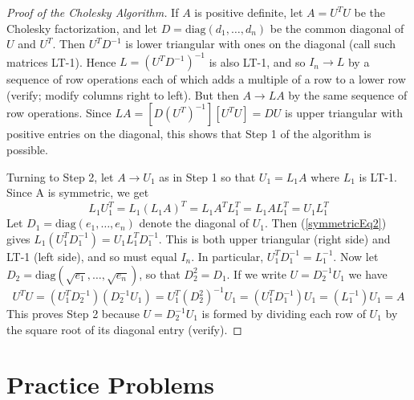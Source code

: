 \documentclass{ximera}
\begin{document}
\begin{proof}[Proof of the Cholesky Algorithm]
If $A$ is positive definite, let $A = U^{T}U$ be the Cholesky factorization, and let $D = \mbox{diag}(d_{1}, \dots, d_{n})$ be the common diagonal of $U$ and $U^{T}$. Then $U^{T}D^{-1}$ is lower triangular with ones on the diagonal (call such matrices LT-1). Hence $L = (U^{T}D^{-1})^{-1}$ is also LT-1, and so $I_{n} \to L$ by a sequence of row operations each of which adds a multiple of a row
to a lower row (verify; modify columns right to left). But then $A \to LA$ by the same sequence of row operations. Since $LA = [D(U^{T})^{-1}][U^{T}U] = DU$ is upper triangular with positive entries on the diagonal, this shows that Step 1 of the algorithm is possible.

Turning to Step 2, let $A \to U_{1}$ as in Step 1 so that $U_{1} = L_{1}A$ where $L_{1}$ is
LT-1. Since A is symmetric, we get
\begin{equation} \label{symmetricEq2}
L_{1}U_{1}^T = L_{1}(L_{1}A)^T = L_{1}A^TL_{1}^T = L_{1}AL_{1}^T = U_{1}L_{1}^T
\end{equation}
Let $D_{1} = \mbox{diag}(e_{1}, \dots, e_{n})$ denote the diagonal of $U_{1}$. Then (\ref{symmetricEq2}) gives $L_{1}(U_{1}^TD_{1}^{-1}) = U_{1}L_{1}^TD_{1}^{-1}$. This is both upper triangular (right side) and LT-1 (left side), and so must equal $I_{n}$. In particular, $U_{1}^TD_{1}^{-1} = L_{1}^{-1}$. Now let $D_{2} = \mbox{diag}(\sqrt{e_{1}}, \dots, \sqrt{e_{n}})$, so that $D_{2}^2 = D_{1}$. If we write $U = D_{2}^{-1}U_{1}$
 we have
\begin{equation*}
U^TU = (U_{1}^TD_{2}^{-1})(D_{2}^{-1}U_{1}) = U_{1}^T(D_{2}^2)^{-1}U_{1} = (U_{1}^TD_{1}^{-1})U_{1} = (L_{1}^{-1})U_{1} = A
\end{equation*}
This proves Step 2 because $U = D_{2}^{-1}U_{1}$ is formed by dividing each row of $U_{1}$ by the square root of its diagonal entry (verify).
\end{proof}

\section*{Practice Problems}
\end{document}
